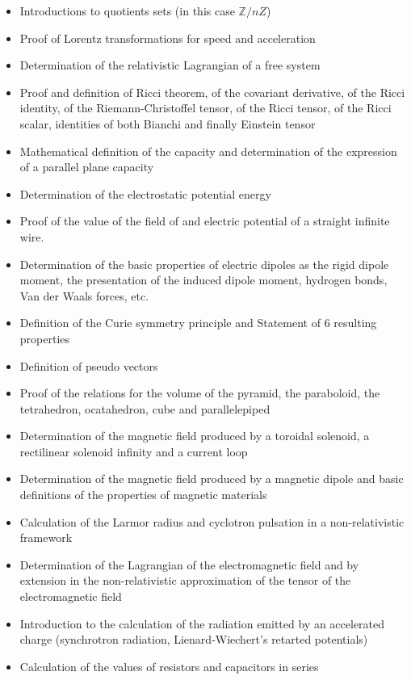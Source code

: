 \documentclass[12pt,a4paper,twoside,openright]{report}
\newcounter{def}
\theoremstyle{definition}
\theoremstyle{itexmp}
\numberwithin{equation}{section}
\begin{document}
\begin{itemize}
\begin{itemize}[noitemsep]
				\item Introductions to quotients sets (in this case $\mathbb{Z}/nZ$)
				\item Proof of Lorentz transformations for speed and acceleration
				\item Determination of the relativistic Lagrangian of a free system
				\item Proof and definition of Ricci theorem, of the covariant derivative, of the Ricci identity, of the Riemann-Christoffel tensor, of the Ricci tensor, of the Ricci scalar, identities of both Bianchi and finally Einstein tensor
				\item Mathematical definition of the capacity and determination of the expression of a  parallel plane capacity
				\item Determination of the electrostatic potential energy
				\item Proof of the value of the field of and electric potential of a straight infinite wire.
				\item Determination of the basic properties of electric dipoles as the rigid dipole moment, the presentation of the induced dipole moment, hydrogen bonds, Van der Waals forces, etc.
				\item Definition of the Curie symmetry principle and Statement of 6 resulting properties
				\item Definition of pseudo vectors
				\item Proof of the relations for the volume of the pyramid, the paraboloid, the tetrahedron,  ocatahedron, cube and parallelepiped
				\item Determination of the magnetic field produced by a toroidal solenoid, a rectilinear solenoid infinity and a current loop
				\item Determination of the magnetic field produced by a magnetic dipole and basic definitions of the properties of magnetic materials
				\item Calculation of the Larmor radius and cyclotron pulsation in a non-relativistic framework
				\item Determination of the Lagrangian of the electromagnetic field and by extension in the non-relativistic approximation of the tensor of the electromagnetic field
				\item Introduction to the calculation of the radiation emitted by an accelerated charge (synchrotron radiation, Lienard-Wiechert's retarted potentials)
				\item Calculation of the values of resistors and capacitors in series

\end{itemize}
\end{itemize}
\end{document}
